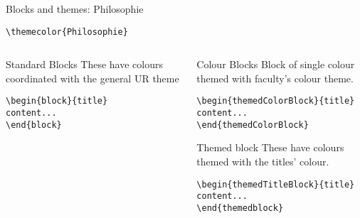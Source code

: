 \begingroup
{}
\begin{frame}[fragile]{Blocks and themes: Philosophie}
    \begin{center}\verb|\themecolor{Philosophie}|\end{center}
\begin{columns} %
\begin{column}{0.3\textwidth}
\begin{block}{Standard Blocks}
These have colours coordinated with the general UR theme
\begin{verbatim}
\begin{block}{title}
content...
\end{block}
\end{verbatim}
\end{block}
\end{column}
\begin{column}{0.7\textwidth}
\begin{themedColorBlock}{Colour Blocks}
Block of single colour themed with faculty's colour theme.
\small
\begin{verbatim}
\begin{themedColorBlock}{title}
content...
\end{themedColorBlock}
\end{verbatim}
\end{themedColorBlock}
\begin{themedTitleBlock} {Themed block}
These have colours themed with the titles' colour.
\small
\begin{verbatim}
\begin{themedTitleBlock}{title}
content...
\end{themedblock}
\end{verbatim}
\end{themedTitleBlock}
\end{column}
\end{columns}
\end{frame}
\endgroup


